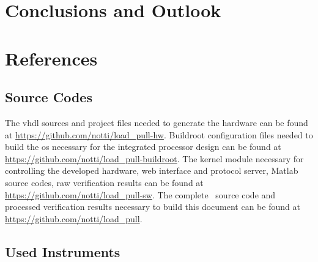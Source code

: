 \documentclass[12pt,a4paper,parskip=full,abstract=true,BCOR=12mm,twoside,open=right]{scrreprt}
\begin{document}

\chapter{Conclusions and Outlook}

\appendix
\chapter{References}
\section{Source Codes}
\label{sec:sources}

The \gls{vhdl} sources and project files needed to generate the hardware can be found at
\url{https://github.com/notti/load_pull-hw}. Buildroot configuration files needed to build
the \gls{os} necessary for the integrated processor design can be found at
\url{https://github.com/notti/load_pull-buildroot}. The kernel module necessary for controlling
the developed hardware, web interface and protocol server, Matlab source codes, raw verification results
can be found at \url{https://github.com/notti/load_pull-sw}. The complete \LuaLaTeX~source code
and processed verification results necessary to build this document can be found at
\url{https://github.com/notti/load_pull}.

\section{Used Instruments}
\label{sec:instruments}
\end{document}
